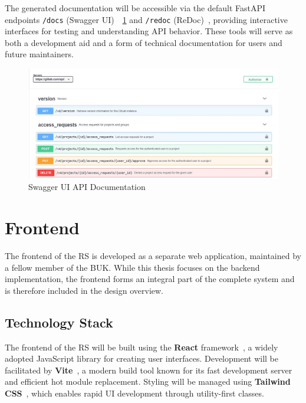 The generated documentation will be accessible via the default FastAPI endpoints \texttt{/docs} (Swagger UI)~\cite{SwaggerUI}~\ref{fig:api-documentation} and \texttt{/redoc} (ReDoc)~\cite{ReDoc}, providing interactive interfaces for testing and understanding API behavior. These tools will serve as both a development aid and a form of technical documentation for users and future maintainers.

\begin{figure}[!htbp]
  \centering
  \includegraphics[width=\linewidth]{images/api-documentation}
  \caption{Swagger UI API Documentation~\cite{SwaggerUI}}
  \label{fig:api-documentation}
\end{figure}

\section{Frontend}

The frontend of the RS is developed as a separate web application, maintained by a fellow member of the BUK. While this thesis focuses on the backend implementation, the frontend forms an integral part of the complete system and is therefore included in the design overview.

\subsection{Technology Stack}

The frontend of the RS will be built using the \textbf{React} framework~\cite{React}, a widely adopted JavaScript library for creating user interfaces. Development will be facilitated by \textbf{Vite}~\cite{Vite}, a modern build tool known for its fast development server and efficient hot module replacement. Styling will be managed using \textbf{Tailwind CSS}~\cite{Tailwind}, which enables rapid UI development through utility-first classes.

